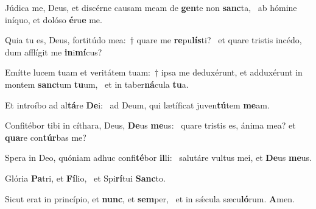 \item Júdica me, Deus, et discérne causam meam de \textbf{gen}te non \textbf{sanc}ta,~\psstar{} ab hómine iníquo, et dolóso \textbf{é}ru\textbf{e} me.
\item Quia tu es, Deus, fortitúdo mea:~† quare me \textbf{re}pu\textbf{lís}ti?~\psstar{} et quare tristis incédo, dum afflígit me \textbf{in}i\textbf{mí}cus?
\item Emítte lucem tuam et veritátem tuam:~† ipsa me deduxérunt, et adduxérunt in montem \textbf{sanc}tum \textbf{tu}um,~\psstar{} et in taber\textbf{ná}cula \textbf{tu}a.
\item Et introíbo ad al\textbf{tá}re \textbf{De}i:~\psstar{} ad Deum, qui lætíficat juven\textbf{tú}tem \textbf{me}am.
\item Confitébor tibi in cíthara, Deus, \textbf{De}us \textbf{me}us:~\psstar{} quare tristis es, ánima mea? et \textbf{qua}re con\textbf{túr}bas me?
\item Spera in Deo, quóniam adhuc confi\textbf{té}bor \textbf{il}li:~\psstar{} salutáre vultus mei, et \textbf{De}us \textbf{me}us.
\item Glória \textbf{Pa}tri, et \textbf{Fí}lio,~\psstar{} et Spi\textbf{rí}tui \textbf{Sanc}to.
\item Sicut erat in princípio, et \textbf{nunc}, et \textbf{sem}per,~\psstar{} et in sǽcula sæcu\textbf{ló}rum. \textbf{A}men.

